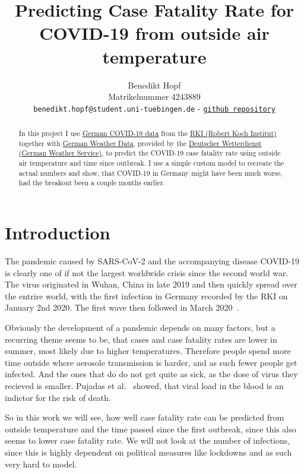 \documentclass{article}
\title{Predicting Case Fatality Rate for COVID-19 from outside air temperature}
\author{%
  Benedikt Hopf\\
  Matrikelnummer 4243889\\
  \texttt{benedikt.hopf@student.uni-tuebingen.de} - \href{https://github.com/benedikthopf/DataLit-COVID-CFR-from-temperature}{\texttt{github repository}} \\
}
\begin{document}
\maketitle

\begin{abstract}

  In this project I use \href{https://www.arcgis.com/sharing/rest/content/items/f10774f1c63e40168479a1feb6c7ca74/data}{German COVID-19 data} from the \href{https://www.rki.de/DE/Home/homepage_node.html}{RKI (Robert Koch Institut)} together with \href{https://opendata.dwd.de/climate_environment/CDC/observations_germany/climate/hourly/air_temperature/}{German Weather Data}, provided by the \href{https://www.dwd.de/DE/Home/home_node.html}{Deutscher Wetterdienst (German Weather Service)}, to predict the COVID-19 case fatality rate using outside air temperature and time since outbreak. I use a simple custom model to recreate the actual numbers and show, that COVID-19 in Germany might have been much worse, had the breakout been a couple months earlier.

\end{abstract}

\section{Introduction}
\label{sec:introduction}

The pandemic caused by SARS-CoV-2 and the accompanying disease COVID-19 is clearly one of if not the largest worldwide crisis since the second world war. The virus originated in Wuhan, China in late 2019 and then quickly spread over the entrire world, with the first infection in Germany recorded by the RKI on January 2nd 2020. The first wave then followed in March 2020~\cite{rki_2022}.  

Obviously the development of a pandemic depends on many factors, but a recurring theme seems to be, that cases and case fatality rates are lower in summer, most likely due to higher temperatures. Therefore people spend more time outside where aerosole transmission is harder, and as such fewer people get infected. And the ones that do do not get quite as sick, as the dose of virus they recieved is smaller. Pujadas et al.~\cite{pujadas_chaudhry_mcbride_richter_zhao_wajnberg_nadkarni_glicksberg_houldsworth_cordon-cardo_et_al._2020} showed, that viral load in the blood is an indictor for the risk of death.

So in this work we will see, how well case fatality rate can be predicted from outside temperature and the time passed since the first outbreak, since this also seems to lower case fatality rate. We will not look at the number of infections, since this is highly dependent on political measures like lockdowns and as such very hard to model. 
\end{document}
